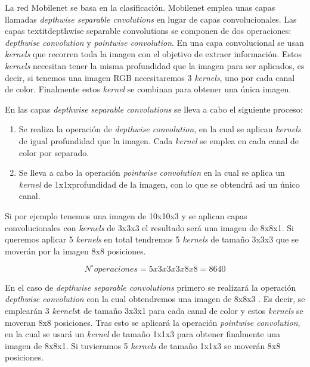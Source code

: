 La red Mobilenet se basa en la clasificación. Mobilenet emplea unas capas llamadas \textit{depthwise separable cnvolutions} en lugar de capas convolucionales. Las capas textit{depthwise separable convolutions} se componen de dos operaciones: \textit{depthwise convolution} y \textit{pointwise convolution}. En una capa convolucional se usan \textit{kernels} que recorren toda la imagen con el objetivo de extraer información. Estos \textit{kernels} necesitan tener la misma profundidad que la imagen para ser aplicados, es decir, si tenemos una imagen RGB necesitaremos 3 \textit{kernels}, uno por cada canal de color. Finalmente estos \textit{kernel} se combinan para obtener una única imagen. 

En las capas \textit{depthwise separable convolutions} se lleva a cabo el siguiente proceso:
\begin{enumerate}
    \item Se realiza la operación de \textit{depthwise convolution}, en la cual se aplican \textit{kernels} de igual profundidad que la imagen. Cada \textit{kernel} se emplea en cada canal de color por separado.
    \item Se lleva a cabo la operación \textit{pointwise convolution} en la cual se aplica un \textit{kernel} de 1x1xprofundidad de la imagen, con lo que se obtendrá así un único canal.
\end{enumerate}

Si por ejemplo tenemos una imagen de 10x10x3 y se aplican capas convolucionales con \textit{kernels} de 3x3x3 el resultado será una imagen de 8x8x1. Si queremos aplicar 5 \textit{kernels} en total tendremos 5 \textit{kernels} de tamaño 3x3x3 que se moverán por la imagen 8x8 posiciones.

\begin{equation}\label{convolucional_formula}
N^{\circ} operaciones = 5x3x3x3x8x8 = 8640
\end{equation}

En el caso de \textit{depthwise separable convolutions} primero se realizará la operación \textit{depthwise convolution} con la cual obtendremos una imagen de 8x8x3 . Es decir, se emplearán 3 \textit{kernels}t de tamaño 3x3x1 para cada canal de color y estos \textit{kernels} se moveran 8x8 posiciones. Tras esto se aplicará la operación \textit{pointwise convolution}, en la cual se usará un \textit{kernel} de tamaño 1x1x3 para obtener finalmente una imagen de 8x8x1. Si tuvieramos 5 \textit{kernels} de tamaño 1x1x3 se moverán 8x8 posiciones.

